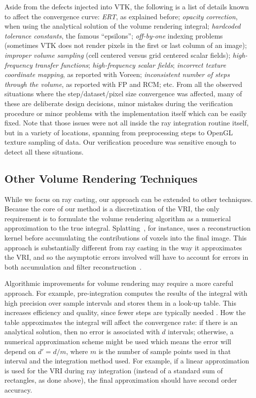 Aside from the defects injected into VTK, the following is a list of
details known to affect the convergence curve:
\emph{ERT}, as explained before;
\emph{opacity correction}, when using the analytical solution of the volume rendering integral;
\emph{hardcoded tolerance constants}, the famous ``epsilons'';
\emph{off-by-one} indexing problems (sometimes VTK does not render pixels in the first or last
column of an image);
\emph{improper volume sampling} (cell centered versus grid centered
scalar fields);
\emph{high-frequency transfer functions};
\emph{high-frequency scalar fields};
\emph{incorrect texture coordinate mapping}, as reported with Voreen;
\emph{inconsistent number of steps through the volume}, as reported
with FP and RCM; etc. %
From all the observed situations where the step/dataset/pixel size
convergence was affected, many of these are deliberate design
decisions, minor mistakes during the verification procedure or minor
problems with the implementation itself which can be easily fixed.
%
Note that those issues were not all inside the ray integration routine
itself, but in a variety of locations, spanning from preprocessing
steps to OpenGL texture sampling of data.
Our verification procedure was sensitive enough to detect all these
situations. 

\subsection{Other Volume Rendering Techniques}

While we focus on ray casting, our approach can be extended to other
techniques. Because the core of our method is a discretization of the
VRI, the only requirement is to formulate the volume rendering
algorithm as a numerical approximation to the true integral.
Splatting~\cite{Westover:1989:IVR:329129.329138}, for instance, uses a
reconstruction kernel before accumulating the contributions of voxels
into the final image. This approach is substantially different from
ray casting in the way it approximates the VRI, and so the asymptotic
errors involved will have to account for errors in both accumulation
and filter reconstruction~\cite{Moller:1996:CLE:236226.236235}.

Algorithmic improvements for volume rendering may require a more
careful approach. For example, pre-integration computes the results of
the integral with high precision over sample intervals and stores them
in a look-up table. This increases efficiency and quality, since
fewer steps are typically needed \cite{Engel01}. How the table
approximates the integral will affect the convergence rate: if there
is an analytical solution, then no error is associated with $d$
intervals; otherwise, a numerical approximation scheme might be used
which means the error will depend on $d' = d / m$, where $m$ is the
number of sample points used in that interval and the integration
method used. For example, if a linear approximation is used for the
VRI during ray integration (instead of a standard sum of rectangles,
as done above), the final approximation should have second order
accuracy.

